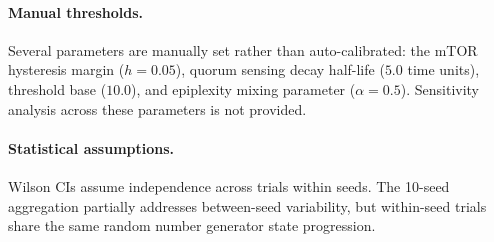 \paragraph{Manual thresholds.}
Several parameters are manually set rather than auto-calibrated:
the mTOR hysteresis margin ($h = 0.05$), quorum sensing decay
half-life ($5.0$ time units), threshold base ($10.0$), and
epiplexity mixing parameter ($\alpha = 0.5$).  Sensitivity analysis
across these parameters is not provided.

\paragraph{Statistical assumptions.}
Wilson CIs assume independence across trials within seeds.  The
10-seed aggregation partially addresses between-seed variability,
but within-seed trials share the same random number generator state
progression.
